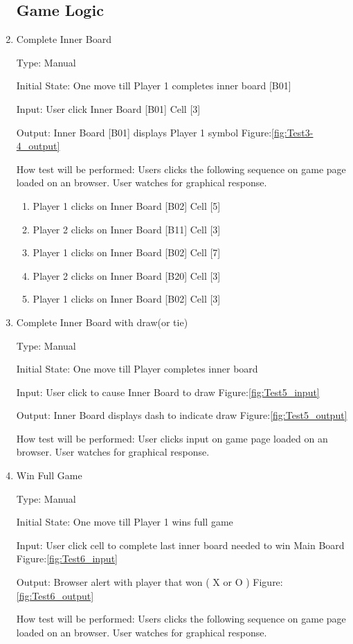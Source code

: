 \documentclass[12pt, titlepage]{article}
\begin{document}
\begin{enumerate}
\subsection{Game Logic}

\item{Complete Inner Board\\}

Type: Manual
					
Initial State: One move till Player 1 completes inner board [B01]
					
Input: User click Inner Board [B01] Cell [3] 
					
Output:  Inner Board [B01] displays Player 1 symbol Figure:\ref{fig:Test3-4_output}
					
How test will be performed: Users clicks the following sequence on game page loaded on an browser. User watches for graphical response.
\begin{enumerate}
	\item Player 1 clicks on Inner Board [B02] Cell [5]
	\item Player 2 clicks on Inner Board [B11] Cell [3]
	\item Player 1 clicks on Inner Board [B02] Cell [7]
	\item Player 2 clicks on Inner Board [B20] Cell [3]
	\item Player 1 clicks on Inner Board [B02] Cell [3]
\end{enumerate}

\item{Complete Inner Board with draw(or tie) \\}

Type: Manual
					
Initial State: One move till Player completes inner board
					
Input: User click to cause Inner Board to draw Figure:\ref{fig:Test5_input}
					
Output:  Inner Board displays dash to indicate draw Figure:\ref{fig:Test5_output}
					
How test will be performed: User clicks input on game page loaded on an browser. User watches for graphical response.

\item{Win Full Game\\}

Type: Manual
					
Initial State: One move till Player 1 wins full game
					
Input: User click cell to complete last inner board needed to win Main Board Figure:\ref{fig:Test6_input}
					
Output:  Browser alert with player that won ( X or O ) Figure:\ref{fig:Test6_output}
					
How test will be performed: Users clicks the following sequence on game page loaded on an browser. User watches for graphical response.

\end{enumerate}
	
\end{document}
